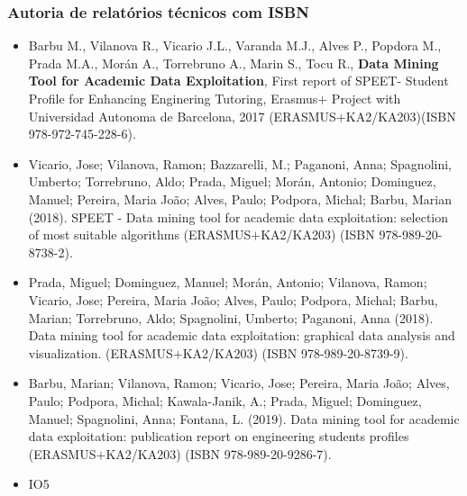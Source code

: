 \documentclass[11pt]{article}
\begin{document}
\subsubsection{Autoria de relatórios técnicos com ISBN}
\begin{itemize}
\item{ Barbu M., Vilanova R., Vicario J.L., Varanda M.J., Alves P., Popdora M., Prada M.A., Morán A., Torrebruno A., Marin S., Tocu R., {\bf{ {Data Mining Tool for Academic Data Exploitation}}}, First report of SPEET- Student Profile for Enhancing Enginering Tutoring, Erasmus$+$ Project with Universidad Autonoma de Barcelona, 2017 (ERASMUS$+$KA2/KA203)(ISBN 978-972-745-228-6).}
\item{ Vicario, Jose; Vilanova, Ramon; Bazzarelli, M.; Paganoni, Anna; Spagnolini, Umberto; Torrebruno, Aldo; Prada, Miguel; Morán, Antonio; Dominguez, Manuel; Pereira, Maria João; Alves, Paulo; Podpora, Michal; Barbu, Marian (2018). SPEET - Data mining tool for academic data exploitation: selection of most suitable algorithms (ERASMUS$+$KA2/KA203) (ISBN 978-989-20-8738-2).}
\item{ Prada, Miguel; Dominguez, Manuel; Morán, Antonio; Vilanova, Ramon; Vicario, Jose; Pereira, Maria João; Alves, Paulo; Podpora, Michal; Barbu, Marian; Torrebruno, Aldo; Spagnolini, Umberto; Paganoni, Anna (2018). Data mining tool for academic data exploitation: graphical data analysis and visualization. (ERASMUS$+$KA2/KA203) (ISBN 978-989-20-8739-9).}
\item{ Barbu, Marian; Vilanova, Ramon; Vicario, Jose; Pereira, Maria João; Alves, Paulo; Podpora, Michal; Kawala-Janik, A.; Prada, Miguel; Dominguez, Manuel; Spagnolini, Anna; Fontana, L. (2019). Data mining tool for academic data exploitation: publication report on engineering students profiles (ERASMUS$+$KA2/KA203) (ISBN 978-989-20-9286-7).}
\item{ IO5 }
\end{itemize}
\end{document}
